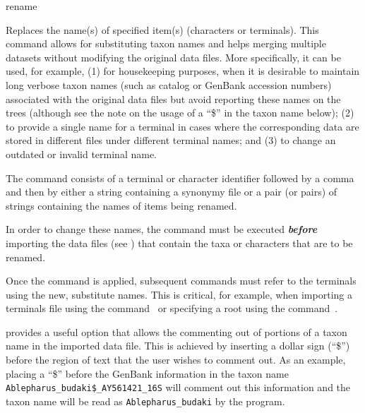 
\begin{command}{rename}{}


\begin{poydescription} 
Replaces the name(s) of specified item(s) (characters or terminals). This command allows 
for substituting taxon names and helps merging multiple datasets without modifying the original
data files. More specifically, it can be used, for example, (1) for housekeeping purposes,
when it is desirable to maintain long verbose taxon names (such as catalog or GenBank
accession numbers) associated with the original data files but avoid reporting these 
names on the trees (although see the note on the usage of a ``\$'' in the taxon name below); 
(2) to provide a single name for a terminal in cases where the corresponding
data are stored in different files under different terminal names; and (3) to change an
outdated or invalid terminal name.

The command consists of a terminal or character identifier followed by a comma and then by
either a string containing a synonymy file or a pair (or pairs) of strings containing the names of
items being renamed.

In order to change these names, the command  must be
executed {\bf \emph{before}} importing the data files (see )
that contain the taxa or characters that are to be renamed.
\end{poydescription} 

\begin{statement}
Once the command  is applied, subsequent commands 
must refer to the terminals using the new, substitute names. This is critical, for example,
when importing a terminals file using the command~ or specifying
a root using the command~.
\end{statement}

\begin{statement}
\poy provides a useful option that allows the commenting out of portions of a taxon name in the imported
data file. This is achieved by inserting a dollar sign (``\$'') before the region of text that the user wishes to comment 
out. As an example, placing a ``\$'' before the GenBank information in the taxon name 
\texttt{Ablepharus\_budaki\$\_AY561421\_16S} will comment out this information and the taxon 
name will be read as \texttt{Ablepharus\_budaki} by the program.
\end{statement}


\end{command}
